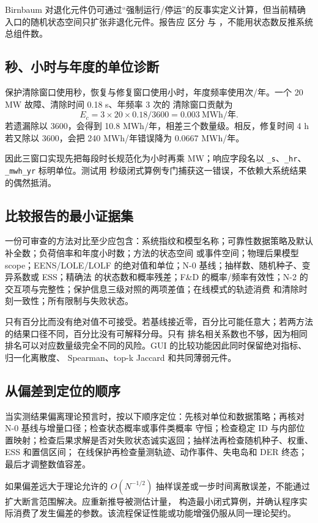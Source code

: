 Birnbaum 对退化元件仍可通过“强制运行/停运”的反事实定义计算，但当前精确入口的随机状态空间只扩张非退化元件。报告应
区分  与 ，不能用状态数反推系统总组件数。

\subsection{秒、小时与年度的单位诊断}
保护清除窗口使用秒，恢复与修复窗口使用小时，年度频率使用次/年。一个 20 MW 故障、清除时间 0.18 s、年频率 3 次的
清除窗口贡献为
\begin{equation}
 E_c=3\times20\times0.18/3600=0.003\ \text{MWh/年}.
\end{equation}
若遗漏除以 3600，会得到 10.8 MWh/年，相差三个数量级。相反，修复时间 4 h 若又除以 3600，会把 240 MWh/年错误降为
0.0667 MWh/年。

因此三窗口实现先把每段时长规范化为小时再乘 MW；响应字段名以 \verb|_s|、\verb|_hr|、\verb|_mwh_yr| 标明单位。测试用
秒级闭式算例专门捕获这一错误，不依赖大系统结果的偶然抵消。

\subsection{比较报告的最小证据集}
一份可审查的方法对比至少应包含：系统指纹和模型名称；可靠性数据策略及默认补全数；负荷倍率和年度小时数；方法的状态空间
或事件空间；物理后果模型 scope；EENS/LOLE/LOLF 的绝对值和单位；N-0 基线；抽样数、随机种子、变异系数或 ESS；精确法
的状态数和概率残差；F\&D 的概率/频率有效性；N-2 的交互项与完整性；保护信息三级对照的两项差值；在线模式的轨迹消费
和清除时刻一致性；所有限制与失败状态。

只有百分比而没有绝对值不可接受。若基线接近零，百分比可能任意大；若两方法的结果口径不同，百分比没有可解释分母。只有
排名相关系数也不够，因为相同排名可以对应数量级完全不同的风险。GUI 的比较功能因此同时保留绝对指标、归一化离散度、
Spearman、top-k Jaccard 和共同薄弱元件。

\subsection{从偏差到定位的顺序}
当实测结果偏离理论预言时，按以下顺序定位：先核对单位和数据策略；再核对 N-0 基线与增量口径；检查状态概率或事件类概率
守恒；检查稳定 ID 与内部位置映射；检查后果求解是否对失败状态诚实返回；抽样法再检查随机种子、权重、ESS 和置信区间；
在线保护再检查量测轨迹、动作事件、失电岛和 DER 终态；最后才调整数值容差。

如果偏差远大于理论允许的 $O(N^{-1/2})$ 抽样误差或一步时间离散误差，不能通过扩大断言范围解决。应重新推导被测估计量，
构造最小闭式算例，并确认程序实际消费了发生偏差的参数。该流程保证性能或功能增强仍服从同一理论契约。
